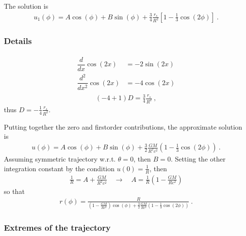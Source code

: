 \documentclass[letterpaper,10pt,english]{jupyterBook}
\begin{document}
\sphinxAtStartPar
The solution is
\begin{equation*}
\begin{split}u_1(\phi) = A \cos(\phi) + B \sin(\phi) + \frac{3}{4} \frac{r_s}{R^2} \left[ 1 - \frac{1}{3} \cos(2\phi) \right] \ .\end{split}
\end{equation*}\subsubsection*{Details}
\begin{equation*}
\begin{split}\begin{aligned}
  \dfrac{d}{dx} \cos(2 x) & = - 2 \sin (2x) \\
  \dfrac{d^2}{dx^2} \cos(2 x) & = - 4 \cos (2x)
\end{aligned}\end{split}
\end{equation*}\begin{equation*}
\begin{split}\left( - 4 + 1 \right) D = \frac{3}{4}\frac{r_s}{R^2} \ ,\end{split}
\end{equation*}
\sphinxAtStartPar
thus \(D = - \frac{1}{4} \frac{r_s}{R^2}\).

\sphinxAtStartPar
Putting together the zero\sphinxhyphen{} and first\sphinxhyphen{}order contributions, the approximate solution is
\begin{equation*}
\begin{split}u(\phi) = A \cos(\phi) + B \sin(\phi) + \frac{3}{2} \frac{GM}{R^2 c^2 } \left( 1 - \frac{1}{3} \cos(2 \phi) \right) \ .\end{split}
\end{equation*}
\sphinxAtStartPar
Assuming symmetric trajectory w.r.t. \(\theta = 0\), then \(B = 0\). Setting the other integration constant by the condition \(u(0) = \frac{1}{R}\), then
\begin{equation*}
\begin{split}
\frac{1}{R} = A + \frac{GM}{R^2 c^2}
\quad \rightarrow \quad
A = \frac{1}{R} \left( 1 - \frac{GM}{ R c^2} \right)
\end{split}
\end{equation*}
\sphinxAtStartPar
so that
\begin{equation*}
\begin{split}r(\phi) = \frac{R}{\left( 1 - \frac{GM}{ R c^2} \right) \cos(\phi) + \frac{3}{2} \frac{GM}{R c^2 } \left( 1 - \frac{1}{3} \cos(2 \phi) \right)} \ .\end{split}
\end{equation*}\subsubsection*{Extremes of the trajectory}
\end{document}
